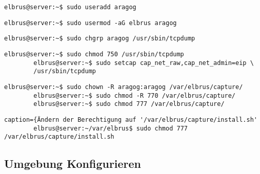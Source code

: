 \documentclass{article}
\begin{document}
	\begin{lstlisting}[caption={Anlegen eines Users der Berechtigungen zum ausführen von 'tcpdump' erhält.}]
		elbrus@server:~$ sudo useradd aragog
	\end{lstlisting}

	\begin{lstlisting}[caption={Hinzufügen von User 'aragog' zu Gruppe 'elbrus'.}]
		elbrus@server:~$ sudo usermod -aG elbrus aragog
	\end{lstlisting}
	
	\begin{lstlisting}[caption={Zuweisen von 'tcpdump' zu der Gruppe 'aragog'.}]
		elbrus@server:~$ sudo chgrp aragog /usr/sbin/tcpdump
	\end{lstlisting}
	
	\begin{lstlisting}[caption={Ändern der Berechtigungen auf 'tcpdump'.}]
		elbrus@server:~$ sudo chmod 750 /usr/sbin/tcpdump
		elbrus@server:~$ sudo setcap cap_net_raw,cap_net_admin=eip \
		/usr/sbin/tcpdump
	\end{lstlisting}

	\begin{lstlisting}[caption={Wechseln des Owners \& der Berechtigung auf '/var/elbrus/capture/'}]
		elbrus@server:~$ sudo chown -R aragog:aragog /var/elbrus/capture/
		elbrus@server:~$ sudo chmod -R 770 /var/elbrus/capture/
		elbrus@server:~$ sudo chmod 777 /var/elbrus/capture/
	\end{lstlisting}

	\begin{lstlisting}caption={Ändern der Berechtigung auf '/var/elbrus/capture/install.sh'
		elbrus@server:~/var/elbrus$ sudo chmod 777 /var/elbrus/capture/install.sh
	\end{lstlisting}
	
	\newpage
	\subsection[file config]{Umgebung Konfigurieren}
\end{document}
